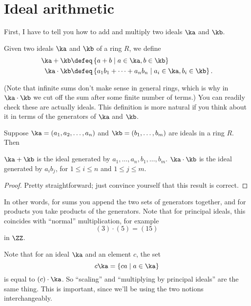 \section{Ideal arithmetic}
First, I have to tell you how to add and multiply two ideals $\ka$ and $\kb$.
\begin{definition}
	Given two ideals $\ka$ and $\kb$ of a ring $R$, we define
	\begin{align*}
		\ka + \kb &\defeq \left\{ a+b \mid a \in \ka, b \in \kb \right\} \\
		\ka \cdot \kb &\defeq \left\{ a_1b_1 + \dots + a_n b_n
			\mid a_i \in \ka, b_i \in \kb \right\}.
	\end{align*}
\end{definition}
(Note that infinite sums don't make sense in general rings, which is why in $\ka \cdot \kb$
we cut off the sum after some finite number of terms.)
You can readily check these are actually ideals.
This definition is more natural if you think about it in terms of
the generators of $\ka$ and $\kb$.
\begin{proposition}
	Suppose $\ka = \left( a_1, a_2, \dots, a_n \right)$
	and $\kb = \left( b_1, \dots, b_m \right)$ are ideals in a ring $R$.
	Then
	\begin{enumerate}[(a)]
		\ii $\ka + \kb$ is the ideal generated by $a_1, \dots, a_n, b_1, \dots, b_m$.
		\ii $\ka \cdot \kb$ is the ideal generated by $a_i b_j$,
		for $1 \le i \le n$ and $1 \le j \le m$.
	\end{enumerate}
\end{proposition}
\begin{proof}
	Pretty straightforward; just convince yourself that this result is correct.
\end{proof}
In other words, for sums you append the two sets of generators together,
and for products you take products of the generators.
Note that for principal ideals, this coincides with ``normal'' multiplication,
for example
\[ (3) \cdot (5) = (15) \]
in $\ZZ$.
\begin{remark}
Note that for an ideal $\ka$ and an element $c$,
the set \[ c \ka = \left\{ ca \mid a \in \ka \right\} \]
is equal to $(c) \cdot \ka$.
So ``scaling'' and ``multiplying by principal ideals'' are the same thing.
This is important, since we'll be using the two notions interchangeably.
\end{remark}
